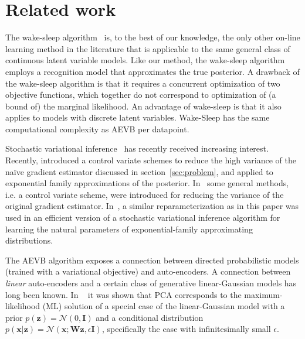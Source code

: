 \documentclass{article} %
\theoremstyle{definition}
\newcommand{\bb}[1]{\mathbf{#1}}
\newcommand{\bx}{\bb{x}}
\newcommand{\bz}{\bb{z}}
\newcommand{\bW}{\bb{W}}
\newcommand{\bI}{\bb{I}}
\theoremstyle{definition}
\begin{document}
\section{Related work}
The wake-sleep algorithm~\cite{hinton1995wake} is, to the best of our knowledge, the only other on-line learning method in the literature that is applicable to the same general class of continuous latent variable models. Like our method, the wake-sleep algorithm employs a recognition model that approximates the true posterior. A drawback of the wake-sleep algorithm is that it requires a concurrent optimization of two objective functions, which together do not correspond to optimization of (a bound of) the marginal likelihood.
%
An advantage of wake-sleep is that it also applies to models with discrete latent variables. Wake-Sleep has the same computational complexity as AEVB per datapoint.

Stochastic variational inference~\cite{hoffman2013stochastic} has recently received increasing interest. Recently, \cite{blei2012variational} introduced a control variate schemes to reduce the high variance of the na\"ive gradient estimator discussed in section~\ref{sec:problem}, and applied to exponential family approximations of the posterior. In~\cite{ranganath2013black} some general methods, i.e. a control variate scheme, were introduced for reducing the variance of the original gradient estimator. In~\cite{salimans2013fixedform}, a similar reparameterization as in this paper was used in an efficient version of a stochastic variational inference algorithm for learning the natural parameters of exponential-family approximating distributions.

%

%

The AEVB algorithm exposes a connection between directed probabilistic models (trained with a variational objective) and auto-encoders. A connection between \emph{linear} auto-encoders and a certain class of generative linear-Gaussian models has long been known. In ~\cite{roweis1998algorithms} it was shown that PCA corresponds to the maximum-likelihood (ML) solution of a special case of the linear-Gaussian model with a prior $p(\bz) = \mathcal{N}(0,\bI)$ and a conditional distribution $p(\bx|\bz) = \mathcal{N}(\bx; \bW \bz, \epsilon \bI)$, specifically the case with infinitesimally small $\epsilon$. 
%
%
%
%
\end{document}
